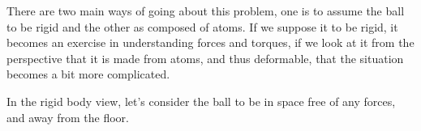 There are two main ways of going about this problem, one is to assume the ball to be rigid and the other as composed of atoms. If we suppose it to be rigid, it becomes an exercise in understanding forces and torques, if we look at it from the perspective that it is made from atoms, and thus deformable, that the situation becomes a bit more complicated.

In the rigid body view, let's consider the ball to be in space free of any forces, and away from the floor.